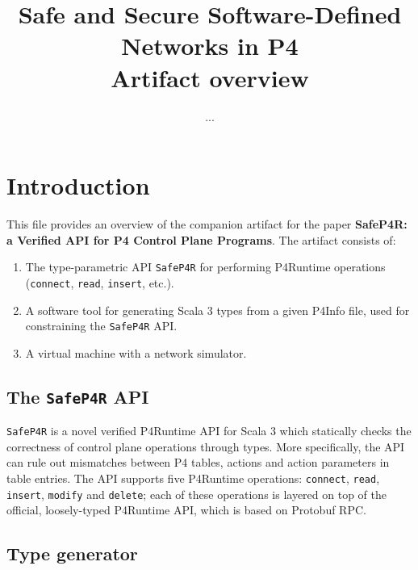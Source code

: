 \documentclass{article}
\title{Safe and Secure Software-Defined Networks in P4\\
    Artifact overview}
\author{...}
\begin{document}
\maketitle

\section{Introduction}
This file provides an overview of the companion artifact for the paper
\textbf{SafeP4R: a Verified API for P4 Control Plane Programs}.
The artifact consists of:

\begin{enumerate}
    \item The type-parametric API \texttt{SafeP4R} for performing
        P4Runtime operations (\texttt{connect}, \texttt{read}, \texttt{insert},
        etc.).
    \item A software tool for generating Scala 3 types from a given P4Info
        file, used for constraining the \texttt{SafeP4R} API.

    \item A virtual machine with a network simulator.
\end{enumerate}

\subsection{The \texttt{SafeP4R} API}
\texttt{SafeP4R} is a novel verified P4Runtime API for Scala 3 which statically
checks the correctness of control plane operations through types. More
specifically, the API can rule out mismatches between P4 tables, actions and
action parameters in table entries. The API supports five P4Runtime operations:
\texttt{connect}, \texttt{read}, \texttt{insert}, \texttt{modify} and
\texttt{delete}; each of these operations is layered on top of the official,
loosely-typed P4Runtime API, which is based on Protobuf RPC.


\subsection{Type generator}
\end{document}
